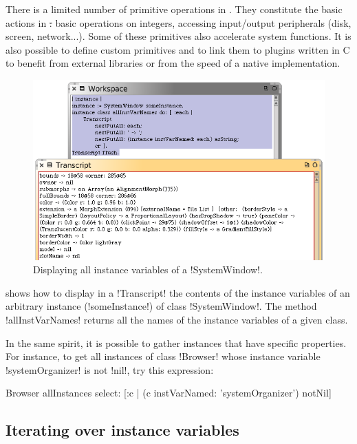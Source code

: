 \documentclass[a4paper,10pt,twoside]{book}
\begin{document}
There is a limited number of primitive operations in \squeak. They constitute the basic actions in \st: basic operations on integers, accessing input/output peripherals (disk, screen, network...).
Some of these primitives also accelerate system functions.
It is also possible to define custom primitives and to link them to plugins written in C to benefit from external libraries or from the speed of a native implementation.

\begin{figure}[ht]\centering
	\includegraphics[width=\linewidth]{allInstanceVariables}
	\caption{Displaying all instance variables of a \ct!SystemWindow!.\label{fig:allInstanceVariables}}
\end{figure}

 shows how to display in a \ct!Transcript! the contents of the instance variables of an arbitrary instance (\ct!someInstance!) of class \ct!SystemWindow!.
The method \ct!allInstVarNames! returns all the names of the instance variables of a given class.

In the same spirit, it is possible to gather instances that have specific properties.
For instance, to get all instances of class \ct!Browser! whose instance variable \ct!systemOrganizer! is not \ct!nil!, try this expression:
\begin{code}{}
Browser allInstances select: [:c | (c instVarNamed: 'systemOrganizer') notNil]
\end{code}

\subsection{Iterating over instance variables}
\end{document}
